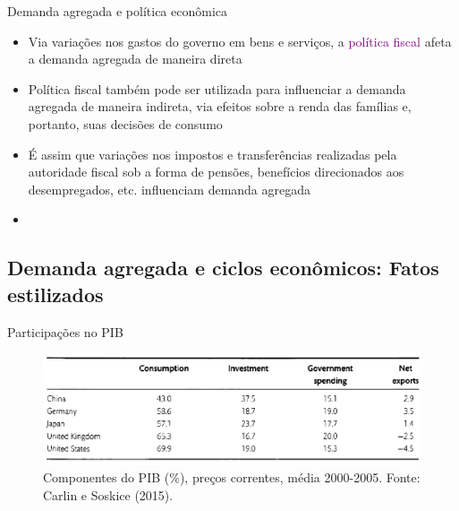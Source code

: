 \documentclass[10pt]{beamer}
\begin{document}
\begin{frame}{Demanda agregada e política econômica}
    \begin{itemize}
        \item Via variações nos gastos do governo em bens e serviços, a \textcolor{purple}{política fiscal} afeta a demanda agregada de maneira direta\bigskip
         
        \item Política fiscal também pode ser utilizada para influenciar a demanda agregada de maneira indireta, via efeitos sobre a renda das famílias e, portanto, suas decisões de consumo\bigskip
         
        \item É assim que variações nos impostos e transferências realizadas pela autoridade fiscal sob a forma de pensões, benefícios direcionados aos desempregados, etc. influenciam demanda agregada\bigskip
         
        \item {}
    \end{itemize}
\end{frame}

\subsection{Demanda agregada e ciclos econômicos: Fatos estilizados}
\begin{frame}{Participações no PIB}
    \begin{figure}
        \centering
        \includegraphics[width=\textwidth]{./figures/aula5_fig2.PNG}
        \caption{Componentes do PIB (\%), preços correntes, média 2000-2005. Fonte: Carlin e Soskice (2015).}
        \label{aula5_fig2}
    \end{figure}
\end{frame}
\end{document}
